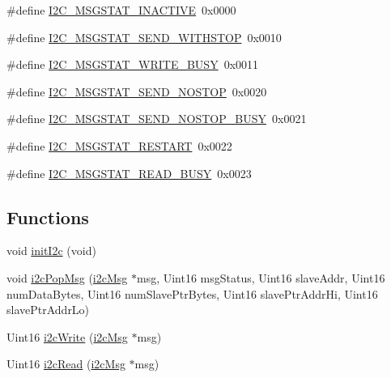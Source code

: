 {\bf }\par
\begin{DoxyCompactItemize}
\item 
\#define \hyperlink{a00025_ad7ff7f3ddb5fb35b633d558b376cf329}{I2\-C\-\_\-\-M\-S\-G\-S\-T\-A\-T\-\_\-\-I\-N\-A\-C\-T\-I\-V\-E}~0x0000
\item 
\#define \hyperlink{a00025_a56f7eeab5c8dbbe042a10d1f8ac1ad55}{I2\-C\-\_\-\-M\-S\-G\-S\-T\-A\-T\-\_\-\-S\-E\-N\-D\-\_\-\-W\-I\-T\-H\-S\-T\-O\-P}~0x0010
\item 
\#define \hyperlink{a00025_a36809495e97c0e8033246b227f9716be}{I2\-C\-\_\-\-M\-S\-G\-S\-T\-A\-T\-\_\-\-W\-R\-I\-T\-E\-\_\-\-B\-U\-S\-Y}~0x0011
\item 
\#define \hyperlink{a00025_a6b46589e75a5bfdc3c57b0bc30cc8671}{I2\-C\-\_\-\-M\-S\-G\-S\-T\-A\-T\-\_\-\-S\-E\-N\-D\-\_\-\-N\-O\-S\-T\-O\-P}~0x0020
\item 
\#define \hyperlink{a00025_adbe18b39fde045ed6d51eaa7e17b78e0}{I2\-C\-\_\-\-M\-S\-G\-S\-T\-A\-T\-\_\-\-S\-E\-N\-D\-\_\-\-N\-O\-S\-T\-O\-P\-\_\-\-B\-U\-S\-Y}~0x0021
\item 
\#define \hyperlink{a00025_adf5a3e5950b5af97d3ec2e40b96c2251}{I2\-C\-\_\-\-M\-S\-G\-S\-T\-A\-T\-\_\-\-R\-E\-S\-T\-A\-R\-T}~0x0022
\item 
\#define \hyperlink{a00025_a9bd9503fa86f5b4d52aeb21be008064a}{I2\-C\-\_\-\-M\-S\-G\-S\-T\-A\-T\-\_\-\-R\-E\-A\-D\-\_\-\-B\-U\-S\-Y}~0x0023
\end{DoxyCompactItemize}

\subsection*{Functions}
\begin{DoxyCompactItemize}
\item 
void \hyperlink{a00025_abcb138d5ddee570bf37734dde6ee291e}{init\-I2c} (void)
\item 
void \hyperlink{a00025_a9e3198d675e7b65c3652bb5c887a7a64}{i2c\-Pop\-Msg} (\hyperlink{a00006}{i2c\-Msg} $\ast$msg, Uint16 msg\-Status, Uint16 slave\-Addr, Uint16 num\-Data\-Bytes, Uint16 num\-Slave\-Ptr\-Bytes, Uint16 slave\-Ptr\-Addr\-Hi, Uint16 slave\-Ptr\-Addr\-Lo)
\item 
Uint16 \hyperlink{a00025_a3813bb8cae6159f7df2672a55be4014b}{i2c\-Write} (\hyperlink{a00006}{i2c\-Msg} $\ast$msg)
\item 
Uint16 \hyperlink{a00025_aa681ec1b6413dd7009a6aaf0df2cbac1}{i2c\-Read} (\hyperlink{a00006}{i2c\-Msg} $\ast$msg)
\end{DoxyCompactItemize}


